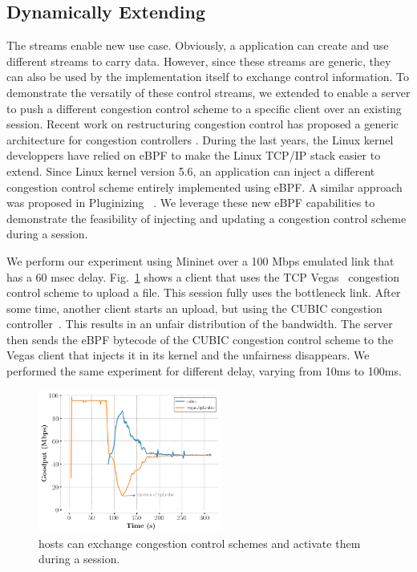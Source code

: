 \subsection{Dynamically Extending \tcpls}

The \tcpls streams enable new use case. Obviously, a \tcpls application can
create and use different streams to carry data. However, since these streams
are generic, they can also be used by the \tcpls implementation itself to
exchange control information. To demonstrate the versatily of these control
streams, we extended \tcpls to enable a server to push a different congestion
control scheme to a specific client over an existing \tcpls session. Recent
work on restructuring congestion control has proposed a generic architecture
for congestion controllers \cite{narayan2018restructuring}.
During the last years, the Linux kernel developpers have relied on eBPF
to make the Linux TCP/IP stack \cite{brakmo2017tcp,tran2020beyond} easier
to extend. Since Linux kernel version 5.6, an application can inject
a different congestion control scheme entirely implemented using eBPF. A similar
approach was proposed in Pluginizing \quic~\cite{de2019pluginizing}.  We
leverage these new eBPF capabilities to demonstrate the feasibility of injecting
and updating a congestion control scheme during a \tcpls session.

We perform our experiment using Mininet  over a 100 Mbps emulated link that has a 60 msec delay.
Fig.~\ref{fig:vegasCubic} shows a client that uses the TCP
Vegas~\cite{10.1145/190314.190317} congestion control scheme to upload a file.
This \tcpls session fully uses the bottleneck link. After some time, another
client starts an upload, but using the CUBIC congestion
controller~\cite{rfc8312}. This results in an unfair distribution of the
bandwidth. The server then sends the eBPF bytecode of the CUBIC congestion
control scheme to the \tcp Vegas client that injects it in its kernel and the
unfairness disappears.  We performed the same experiment for different delay,
varying from 10ms to 100ms.

\begin{figure}[!t]
  \begin{center}
    \includegraphics[width=6cm]{pretty_plotify/plots/vegas_cubic.png}
  \end{center}
  \caption{\tcpls hosts can exchange congestion control schemes and activate them during a \tcpls session.}
  \label{fig:vegasCubic}
\end{figure}
